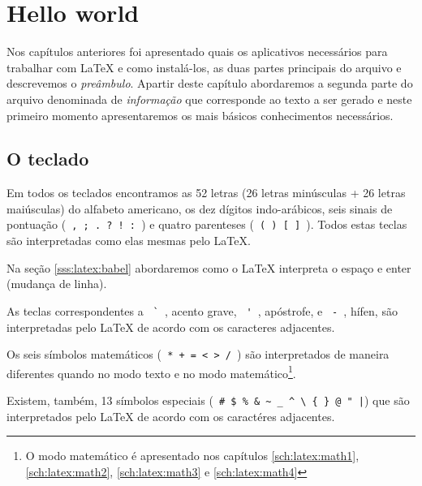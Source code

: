 % 
% 
% 
% 
% 
\chapter{Hello world} \label{sch:latex:hello_world}
Nos capítulos anteriores foi apresentado quais os aplicativos necessários para trabalhar com LaTeX e como instalá-los, as duas partes principais do arquivo  e descrevemos o \textit{preâmbulo}. Apartir deste capítulo abordaremos a segunda parte do arquivo  denominada de \textit{informação} que corresponde ao texto a ser gerado e neste primeiro momento apresentaremos os mais básicos conhecimentos necessários.

\section{O teclado}

Em todos os teclados encontramos as 52 letras (26 letras minúsculas + 26 letras maiúsculas) do alfabeto americano, os dez dígitos indo-arábicos, seis sinais de pontuação (\verb+ , ; . ? ! : +) e quatro parenteses (\verb+ ( ) [ ] +). Todos estas teclas são interpretadas como elas mesmas pelo LaTeX.

Na seção \ref{sss:latex:babel} abordaremos como o LaTeX interpreta o espaço e enter (mudança de linha).

As teclas correspondentes a \verb+ ` +, acento grave, \verb+ ' +, apóstrofe, e \verb+ - +, hífen, são interpretadas pelo LaTeX de acordo com os caracteres adjacentes.

Os seis símbolos matemáticos (\verb: * + = < > / :) são interpretados de maneira diferentes quando no modo texto e no modo matemático\footnote{O modo matemático é apresentado nos capítulos \ref{sch:latex:math1}, \ref{sch:latex:math2}, \ref{sch:latex:math3} e \ref{sch:latex:math4}}.

Existem, também, 13 símbolos especiais (\verb+ # $ % & ~ _ ^ \ { } @ " |+) que são interpretados pelo LaTeX de acordo com os caractéres adjacentes.

